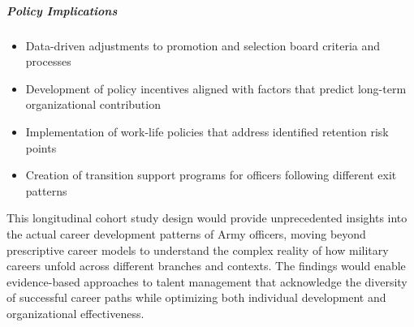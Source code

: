 \documentclass[../main.tex]{subfiles}
\begin{document}
\subparagraph{Policy Implications}
\begin{itemize}
\item Data-driven adjustments to promotion and selection board criteria and processes
\item Development of policy incentives aligned with factors that predict long-term organizational contribution
\item Implementation of work-life policies that address identified retention risk points
\item Creation of transition support programs for officers following different exit patterns
\end{itemize}

This longitudinal cohort study design would provide unprecedented insights into the actual career development patterns of Army officers, moving beyond prescriptive career models to understand the complex reality of how military careers unfold across different branches and contexts. The findings would enable evidence-based approaches to talent management that acknowledge the diversity of successful career paths while optimizing both individual development and organizational effectiveness.


\printbibliography
\end{document}
